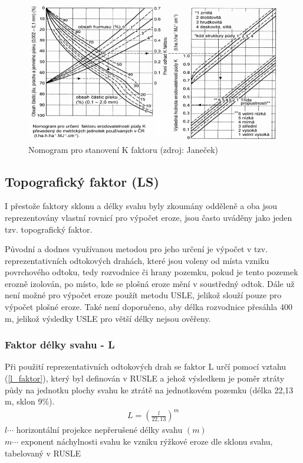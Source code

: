 \begin{figure}[H]
    \centering
    \includegraphics[scale=0.85]{./pictures/k_faktor_nomogram.png}
      \caption[Nomogram pro stanovení K faktoru]{Nomogram pro
        stanovení K faktoru (zdroj: Janeček\cite{janecek2012})}
      \label{fig:k_faktor}
\end{figure}
\subsection{Topografický faktor (LS)}
I přestože faktory sklonu a délky svahu byly zkoumány odděleně a oba
jsou reprezentovány vlastní rovnicí pro výpočet eroze, jsou často
uváděny jako jeden tzv. topografický faktor.\cite{usle1978}

Původní a dodnes využívanou metodou pro jeho určení je výpočet v
tzv. reprezentativních odtokových drahách, které jsou voleny od místa
vzniku povrchového odtoku, tedy rozvodnice či hrany pozemku, pokud je
tento pozemek erozně izolován, po místo, kde se plošná eroze mění v
soustředný odtok. Dále už není možné pro výpočet eroze použít metodu
USLE, jelikož slouží pouze pro výpočet plošné eroze. Také není
doporučeno, aby délka rozvodnice přesáhla 400 m, jelikož výsledky USLE
pro větší délky nejsou ověřeny.\cite{janecek2012}

\subsubsection{Faktor délky svahu - L} 
Při použití reprezentativních odtokových drah se faktor L určí pomocí
vztahu (\ref{l_faktor}), který byl definován v RUSLE\cite{rusle1997} a
jehož výsledkem je poměr ztráty půdy na jednotku plochy svahu ke
ztrátě na jednotkovém pozemku (délka 22,13 m, sklon
9\%).\cite{janecek2012}
\begin{align}
   \label{l_faktor} L=\left( \frac{l}{22,13} \right)^m
\end{align}
\hspace*{2cm}$l \cdots$ horizontální projekce nepřerušené délky svahu
$\left( m \right)$ \\
\hspace*{2cm}$m \cdots$ exponent náchylnosti svahu ke vzniku rýžkové
eroze dle sklonu svahu, tabelovaný v RUSLE\cite{rusle1997} \\

